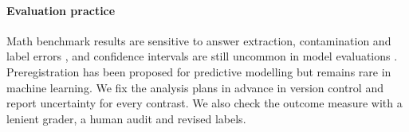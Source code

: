 \paragraph{Evaluation practice} Math benchmark results are sensitive to answer
extraction, contamination and label errors \cite{zhang2024a,vendrow2025platinum,
hochlehnert2025a,biderman2024lessons}, and confidence intervals are still uncommon in
model evaluations \cite{miller2024adding}. Preregistration has been proposed for
predictive modelling \cite{hofman2023preregistration} but remains rare in machine
learning. We fix the analysis plans in advance in version control and report
uncertainty for every contrast. We also check the outcome measure with a lenient
grader, a human audit and revised labels.
